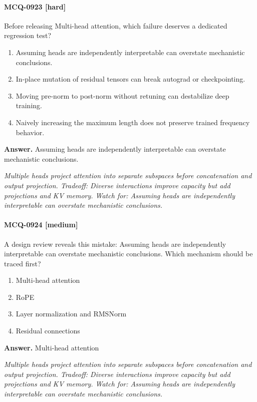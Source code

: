 \paragraph{MCQ-0923 [hard]} Before releasing Multi-head attention, which failure deserves a dedicated regression test?
\begin{enumerate}[label=\Alph*.]
\item Assuming heads are independently interpretable can overstate mechanistic conclusions.
\item In-place mutation of residual tensors can break autograd or checkpointing.
\item Moving pre-norm to post-norm without retuning can destabilize deep training.
\item Naively increasing the maximum length does not preserve trained frequency behavior.
\end{enumerate}
\noindent\textbf{Answer.} Assuming heads are independently interpretable can overstate mechanistic conclusions.
\par\textit{Multiple heads project attention into separate subspaces before concatenation and output projection. Tradeoff: Diverse interactions improve capacity but add projections and KV memory. Watch for: Assuming heads are independently interpretable can overstate mechanistic conclusions.}
\paragraph{MCQ-0924 [medium]} A design review reveals this mistake: Assuming heads are independently interpretable can overstate mechanistic conclusions. Which mechanism should be traced first?
\begin{enumerate}[label=\Alph*.]
\item Multi-head attention
\item RoPE
\item Layer normalization and RMSNorm
\item Residual connections
\end{enumerate}
\noindent\textbf{Answer.} Multi-head attention
\par\textit{Multiple heads project attention into separate subspaces before concatenation and output projection. Tradeoff: Diverse interactions improve capacity but add projections and KV memory. Watch for: Assuming heads are independently interpretable can overstate mechanistic conclusions.}
